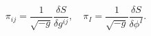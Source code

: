 \begin{equation}
\pi_{ij} = \frac{1}{\sqrt{-g}}\frac{\delta S}{\delta g^{ij}}, \quad
\pi_I = \frac{1}{\sqrt{-g}}\frac{\delta S}{\delta \phi^{I}}.
\end{equation}

